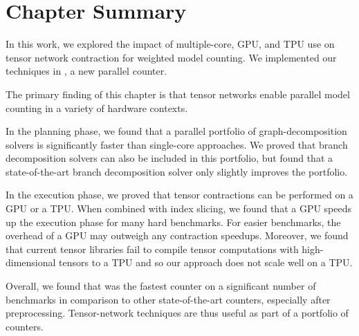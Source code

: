 \section{Chapter Summary}
In this work, we explored the impact of multiple-core, GPU, and TPU use on tensor network contraction for weighted model counting. We implemented our techniques in , a new parallel counter.

The primary finding of this chapter is that tensor networks enable parallel model counting in a variety of hardware contexts.

In the planning phase, we found that a parallel portfolio of graph-decomposition solvers is significantly faster than single-core approaches. We proved that branch decomposition solvers can also be included in this portfolio, but found that a state-of-the-art branch decomposition solver only slightly improves the portfolio. 

In the execution phase, we proved that tensor contractions can be performed on a GPU or a TPU. When combined with index slicing, we found that a GPU speeds up the execution phase for many hard benchmarks. For easier benchmarks, the overhead of a GPU may outweigh any contraction speedups. 
Moreover, we found that current tensor libraries fail to compile tensor computations with high-dimensional tensors to a TPU and so our approach does not scale well on a TPU.

Overall, we found that  was the fastest counter on a significant number of benchmarks in comparison to other state-of-the-art counters, especially after preprocessing. Tensor-network techniques are thus useful as part of a portfolio of counters.
